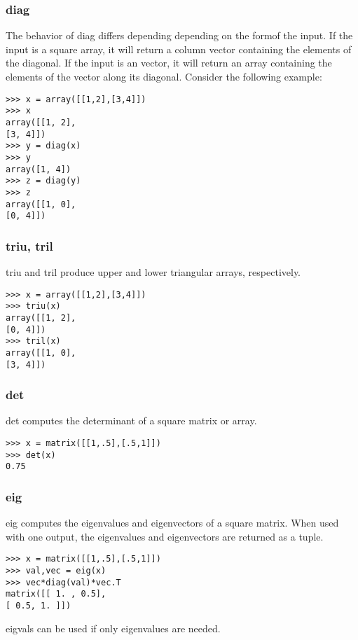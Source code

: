 \subsubsection{diag}
The behavior of diag differs depending depending on the formof the input. If the input is a square array, it
will return a column vector containing the elements of the diagonal. If the input is an vector, it will return
an array containing the elements of the vector along its diagonal. Consider the following example:
\begin{framed}
\begin{verbatim}
>>> x = array([[1,2],[3,4]])
>>> x
array([[1, 2],
[3, 4]])
>>> y = diag(x)
>>> y
array([1, 4])
>>> z = diag(y)
>>> z
array([[1, 0],
[0, 4]])
\end{verbatim}
\end{framed}
\subsubsection{triu, tril}
triu and tril produce upper and lower triangular arrays, respectively.
\begin{framed}
\begin{verbatim}
>>> x = array([[1,2],[3,4]])
>>> triu(x)
array([[1, 2],
[0, 4]])
>>> tril(x)
array([[1, 0],
[3, 4]])

\end{verbatim}
\end{framed}
\subsubsection{det}
det computes the determinant of a square matrix or array.
\begin{framed}
\begin{verbatim}
>>> x = matrix([[1,.5],[.5,1]])
>>> det(x)
0.75
\end{verbatim}
\end{framed}
\subsubsection{eig}
eig computes the eigenvalues and eigenvectors of a square matrix. When used with one output, the eigenvalues
and eigenvectors are returned as a tuple.
\begin{framed}
\begin{verbatim}
>>> x = matrix([[1,.5],[.5,1]])
>>> val,vec = eig(x)
>>> vec*diag(val)*vec.T
matrix([[ 1. , 0.5],
[ 0.5, 1. ]])
\end{verbatim}
\end{framed}
eigvals can be used if only eigenvalues are needed.

